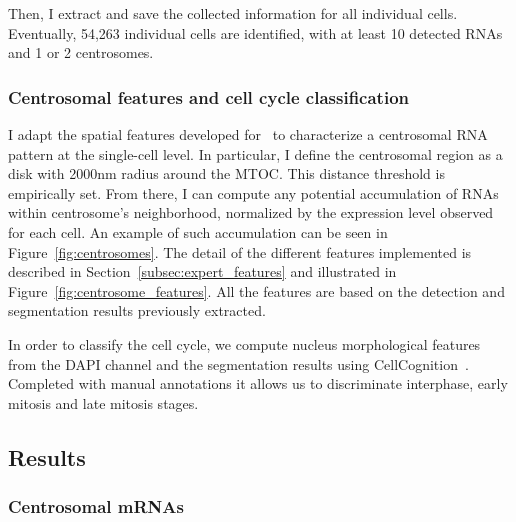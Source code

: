 Then, I extract and save the collected information for all individual cells.
Eventually, 54,263 individual cells are identified, with at least 10 detected \ac{RNA}s and 1 or 2 centrosomes.

\subsubsection{Centrosomal features and cell cycle classification}

I adapt the spatial features developed for~\cite{CHOUAIB_2020} to characterize a centrosomal \ac{RNA} pattern at the single-cell level.
In particular, I define the centrosomal region as a disk with 2000nm radius around the \ac{MTOC}.
This distance threshold is empirically set.
From there, I can compute any potential accumulation of \ac{RNA}s within centrosome's neighborhood, normalized by the expression level observed for each cell.
An example of such accumulation can be seen in Figure~\ref{fig:centrosomes}.
The detail of the different features implemented is described in Section~\ref{subsec:expert_features} and illustrated in Figure~\ref{fig:centrosome_features}.
All the features are based on the detection and segmentation results previously extracted.

In order to classify the cell cycle, we compute nucleus morphological features from the DAPI channel and the segmentation results using CellCognition~\cite{held_cellcognition_2010}.
Completed with manual annotations it allows us to discriminate interphase, early mitosis and late mitosis stages.

\subsection{Results}
\label{subsec:results_centrosomal}

\subsubsection{Centrosomal mRNAs}

